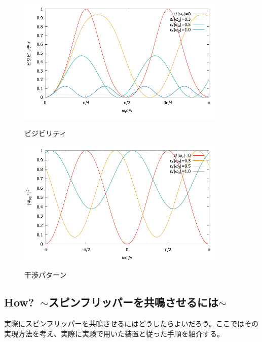 \begin{figure}[h]
\begin{center}
\includegraphics[width=10cm]{resonance/whatwhyhow/resonance_visivility1.pdf}
\caption{ビジビリティ}
\label{Resonance_fig_visivility}
\includegraphics[width=10cm]{resonance/whatwhyhow/resonance_interference1.pdf}
\caption{干渉パターン}
\label{Resonance_fig_interference}
\end{center}
\vspace{-1cm}
\end{figure}



\clearpage
\subsection{How?\ $\sim$スピンフリッパーを共鳴させるには$\sim$}
実際にスピンフリッパーを共鳴させるにはどうしたらよいだろう。ここではその実現方法を考え、実際に実験で用いた装置と従った手順を紹介する。

